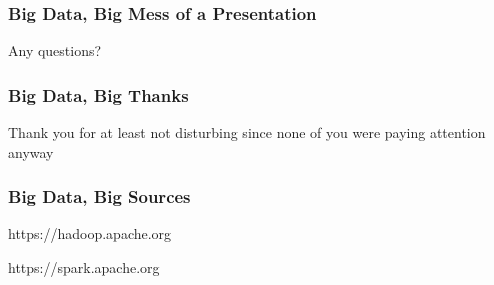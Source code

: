 \documentclass{beamer}
\begin{document}
\begin{frame}
\frametitle{Big Data, Big Mess of a Presentation}
Any questions?
\end{frame}

\begin{frame}
\frametitle{Big Data, Big Thanks}
Thank you for at least not disturbing since none of you were paying attention anyway
\end{frame}

\begin{frame}
\frametitle{Big Data, Big Sources}
https://hadoop.apache.org

https://spark.apache.org
\end{frame}
\end{document}
